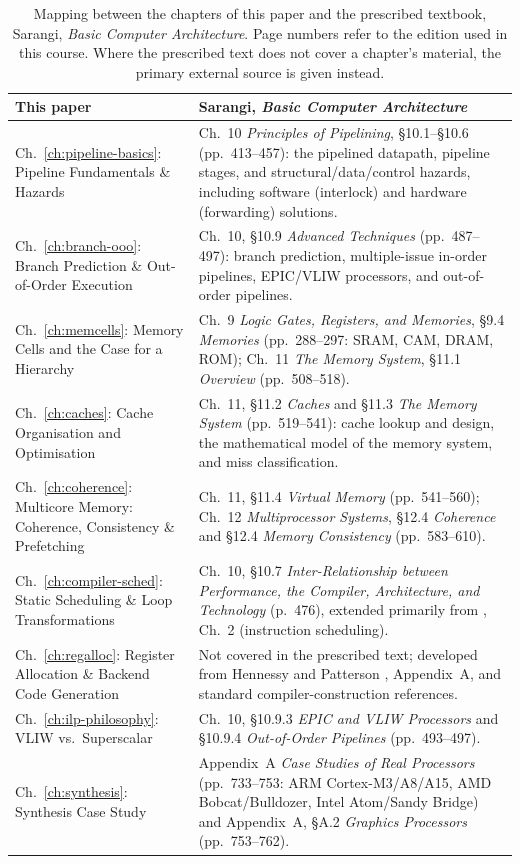 \documentclass[11pt,a4paper]{report}
\begin{document}
\begin{table}[htbp]
\centering
\caption{Mapping between the chapters of this paper and the prescribed
textbook, Sarangi, \emph{Basic Computer Architecture}. Page numbers refer
to the edition used in this course. Where the prescribed text does not
cover a chapter's material, the primary external source is given instead.}
\label{tab:textbook-map}
\begin{tabular}{@{}L{0.40\textwidth}L{0.52\textwidth}@{}}
\toprule
\textbf{This paper} & \textbf{Sarangi, \emph{Basic Computer Architecture}} \\
\midrule
Ch.~\ref{ch:pipeline-basics}: Pipeline Fundamentals \& Hazards &
  Ch.~10 \emph{Principles of Pipelining}, \S10.1--\S10.6 (pp.~413--457):
  the pipelined datapath, pipeline stages, and structural/data/control
  hazards, including software (interlock) and hardware (forwarding)
  solutions. \\
Ch.~\ref{ch:branch-ooo}: Branch Prediction \& Out-of-Order Execution &
  Ch.~10, \S10.9 \emph{Advanced Techniques} (pp.~487--497): branch
  prediction, multiple-issue in-order pipelines, EPIC/VLIW processors,
  and out-of-order pipelines. \\
Ch.~\ref{ch:memcells}: Memory Cells and the Case for a Hierarchy &
  Ch.~9 \emph{Logic Gates, Registers, and Memories}, \S9.4 \emph{Memories}
  (pp.~288--297: SRAM, CAM, DRAM, ROM); Ch.~11 \emph{The Memory System},
  \S11.1 \emph{Overview} (pp.~508--518). \\
Ch.~\ref{ch:caches}: Cache Organisation and Optimisation &
  Ch.~11, \S11.2 \emph{Caches} and \S11.3 \emph{The Memory System}
  (pp.~519--541): cache lookup and design, the mathematical model of the
  memory system, and miss classification. \\
Ch.~\ref{ch:coherence}: Multicore Memory: Coherence, Consistency \&
  Prefetching &
  Ch.~11, \S11.4 \emph{Virtual Memory} (pp.~541--560); Ch.~12
  \emph{Multiprocessor Systems}, \S12.4 \emph{Coherence} and
  \S12.4 \emph{Memory Consistency} (pp.~583--610). \\
Ch.~\ref{ch:compiler-sched}: Static Scheduling \& Loop Transformations &
  Ch.~10, \S10.7 \emph{Inter-Relationship between Performance, the
  Compiler, Architecture, and Technology} (p.~476), extended primarily
  from \cite{shen}, Ch.~2 (instruction scheduling). \\
Ch.~\ref{ch:regalloc}: Register Allocation \& Backend Code Generation &
  Not covered in the prescribed text; developed from Hennessy and
  Patterson \cite{hennessy}, Appendix~A, and standard compiler-construction
  references. \\
Ch.~\ref{ch:ilp-philosophy}: VLIW vs.\ Superscalar &
  Ch.~10, \S10.9.3 \emph{EPIC and VLIW Processors} and \S10.9.4
  \emph{Out-of-Order Pipelines} (pp.~493--497). \\
Ch.~\ref{ch:synthesis}: Synthesis Case Study &
  Appendix~A \emph{Case Studies of Real Processors} (pp.~733--753: ARM
  Cortex-M3/A8/A15, AMD Bobcat/Bulldozer, Intel Atom/Sandy Bridge) and
  Appendix~A, \S A.2 \emph{Graphics Processors} (pp.~753--762). \\
\bottomrule
\end{tabular}
\end{table}
\end{document}
